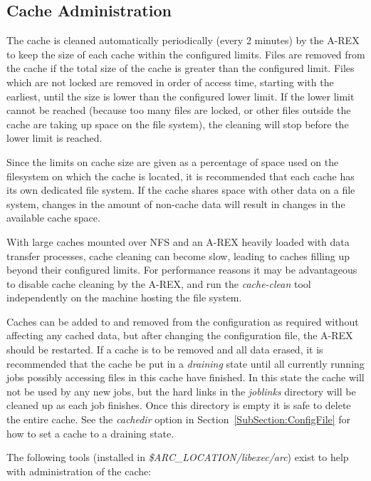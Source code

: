 \documentclass{article}                            %
\begin{document}
\subsection{Cache Administration}

The cache is cleaned automatically periodically (every 2 minutes) by
the A-REX to keep the size of each cache within the configured limits.
Files are removed from the cache if the total size of the cache is
greater than the configured limit. Files which are not locked are
removed in order of access time, starting with the earliest, until the
size is lower than the configured lower limit. If the lower limit
cannot be reached (because too many files are locked, or other files
outside the cache are taking up space on the file system), the
cleaning will stop before the lower limit is reached.

Since the limits on cache size are given as a percentage of space used
on the filesystem on which the cache is located, it is recommended
that each cache has its own dedicated file system. If the cache shares
space with other data on a file system, changes in the amount of
non-cache data will result in changes in the available cache space.

With large caches mounted over NFS and an A-REX heavily loaded with
data transfer processes, cache cleaning can become slow, leading to
caches filling up beyond their configured limits. For performance
reasons it may be advantageous to disable cache cleaning by the A-REX,
and run the \emph{cache-clean} tool independently on the machine
hosting the file system.

Caches can be added to and removed from the configuration as required
without affecting any cached data, but after changing the
configuration file, the A-REX should be restarted. If a cache is to be
removed and all data erased, it is recommended that the cache be put
in a \emph{draining} state until all currently running jobs possibly
accessing files in this cache have finished. In this state the cache
will not be used by any new jobs, but the hard links in the
\emph{joblinks} directory will be cleaned up as each job
finishes. Once this directory is empty it is safe to delete the entire
cache. See the \emph{cachedir} option in
Section~\ref{SubSection:ConfigFile} for how to set a cache to a
draining state.

The following tools (installed in \emph{\$ARC\_LOCATION/libexec/arc})
exist to help with administration of the cache:
\end{document}
